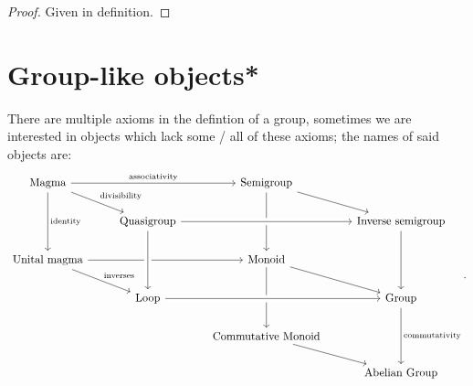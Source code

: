 \documentclass[../Year1/Year1.tex]{subfiles}
\begin{document}
\begin{proof}
    Given in definition.
\end{proof}

\section{Group-like objects*}

\begin{definition}
    There are multiple axioms in the defintion of a group, sometimes we are interested in objects which lack some / all of these axioms; the names of said objects are:
    \[
        \begin{tikzcd}
            \text{Magma} \arrow[rr, "\text{associativity}"] \arrow[rd, "\text{divisibility}"] \arrow[dd, "\text{identity}"] & & \text{Semigroup} \arrow[rd] \arrow[dd] \\
            & \text{Quasigroup} \arrow[rr, crossing over] & & \text{Inverse semigroup} \arrow[dd]\\
            \text{Unital magma} \arrow[rr] \arrow[rd, "\text{inverses}"] & & \text{Monoid} \arrow[rd] \arrow[dd]\\
            & \text{Loop} \arrow[from=uu, crossing over] \arrow[rr, crossing over] & & \text{Group} \arrow[dd, "\text{commutativity}"]\\
            & & \text{Commutative Monoid} \arrow[rd] \\
            & & & \text{Abelian Group}
        \end{tikzcd}
    \textcolor{black}{.}
    \]
\end{definition}
\end{document}
